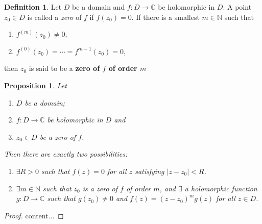 \documentclass[12pt,openany]{book}
\newtheorem{proposition}[theorem]{Proposition}
\theoremstyle{definition}
\newtheorem{definition}{Definition}[chapter]
\newcommand{\N}{\mathbb{N}}
\newcommand{\C}{\mathbb{C}}
\newcommand{\abs}[1]{\left\lvert #1 \right\rvert}
\begin{document}
	\vspace{8pt}
	\begin{tcolorbox}[colback=white,colframe=defcolor,arc=5pt,title={\color{white}\bf Zero}]
		\begin{definition}
			Let $D$ be a domain and $f:D\to\C$ be holomorphic in $D$. A point $z_0\in D$ is called a \textit{zero} of $f$ if $f(z_0)=0$. If there is a smallest $m\in\N$ such that \begin{enumerate}[(1)]
				\item $f^{(m)}(z_0)\neq 0$;
				\item $f^{(0)}(z_0)=\cdots=f^{m-1}(z_0)=0$,
			\end{enumerate} then $z_0$ is said to be a \textbf{zero of $f$ of order $m$}
		\end{definition}
	\end{tcolorbox}	
	\vspace{8pt}
	\begin{tcolorbox}[colback=white,colframe=procolor,arc=5pt,title={\color{white}\bf Classification of Zeros}]
		\begin{proposition}
			Let \begin{enumerate}[(1)]
				\item $D$ be a domain;
				\item $f:D\to\C$ be holomorphic in $D$ and
				\item $z_0\in D$ be a zero of $f$.
			\end{enumerate} Then there are exactly two possibilities: \begin{enumerate}
			\item $\exists R>0$ such that $f(z)=0$ for all $z$ satisfying $\abs{z-z_0}<R$.
			\item $\exists m\in\N$ such that $z_0$ is a zero of $f$ of order $m$, and $\exists$ a holomorphic function $g:D\to\C$ such that $g(z_0)\neq 0$ and $f(z)=(z-z_0)^mg(z)$ for all $z\in D$.
		\end{enumerate}
		\end{proposition}
	\end{tcolorbox}
	\begin{proof}
		content...
	\end{proof}
\end{document}
